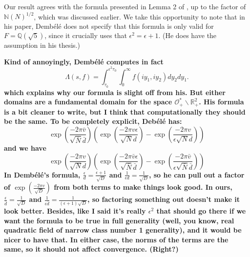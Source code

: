 \documentclass{article}
\theoremstyle{plain}
\begin{document}
Our result agrees with the formula presented in Lemma 2 of \cite{dembele}, up to the factor of $\mathbb{N}(N)^{1/2}$, which was discussed earlier. We take this opportunity to note that in his paper, Demb\'{e}l\'{e} does not specify that this formula is only valid for $F=\mathbb{Q}(\sqrt{5})$, since it crucially uses that $\epsilon^2=\epsilon+1$. (He does have the assumption in his thesis.)

\textbf{Kind of annoyingly, Demb\'{e}l\'{e} computes in fact
\begin{equation*}
\Lambda(s,f)= \int_{\tau_0}^{\epsilon^2 \tau_0}\int_{0}^{\infty} f\left(iy_1,iy_2\right)  dy_2 dy_1.
\end{equation*}
which explains why our formula is slight off from his. But either domains are a fundamental domain for the space $\mathcal{O}_+^*\backslash \mathbb{R}^2_+$. His formula is a bit cleaner to write, but I think that computationally they should be the same. To be completely explicit, Deb\'{e}l\'{e} has:
\begin{equation*}
\exp\left( \frac{-2\pi\bar{v}}{\sqrt{\bar{N}}\bar{d}}\right) \left(\exp\left(\frac{-2 \pi v \epsilon}{\sqrt{N} d}\right) - \exp \left( \frac{-2\pi v}{\epsilon \sqrt{N}d}\right) \right)
\end{equation*}
and we have
\begin{equation*}
\exp\left( \frac{-2\pi v}{\sqrt{N}d}\right) \left(\exp\left(\frac{-2 \pi \bar{v} \epsilon}{\sqrt{\bar{N}} \bar{d}}\right) - \exp \left( \frac{-2\pi \bar{v}}{\epsilon \sqrt{\bar{N}}\bar{d}}\right) \right)
\end{equation*}
In Demb\'{e}l\'{e}'s formula, $\frac{\epsilon}{d}=\frac{\epsilon+1}{\sqrt{D}}$ and $\frac{1}{\epsilon d}=\frac{1}{\sqrt{D}}$, so he can pull out a factor of $\exp\left(\frac{-2 \pi v}{\sqrt{D}}\right)$ from both terms to make things look good. In ours, $\frac{\epsilon}{\bar{d}}=\frac{1}{\sqrt{D}}$ and $\frac{1}{\epsilon \bar{d}}=\frac{1}{(\epsilon+1) \sqrt{D}}$, so factoring something out doesn't make it look better. Besides, like I said it's really $\epsilon^2$ that should go there if we want the formula to be true in full generality (well, you know, real quadratic field of narrow class number 1 generality), and it would be nicer to have that. In either case, the norms of the terms are the same, so it should not affect convergence. (Right?)}

\end{document}
